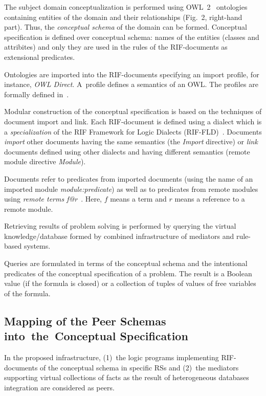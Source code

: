\begin{multicols}{2}
  The subject domain conceptualization is performed using OWL~2~\cite{28-kal}
ontologies containing entities of the domain and their relationships (Fig.~2,
  right-hand part). Thus, the \textit{conceptual schema} of the domain can be formed.
Conceptual specification is defined over conceptual schema: names of the entities (classes and attribites)
and only they are used in the rules of the RIF-documents as extensional predicates. 
  
  Ontologies are imported into the RIF-documents specifying an
import profile, for instance, \textit{OWL Direct}. A~profile defines a semantics of an
OWL. The profiles are formally defined in~\cite{27-kal}.

  Modular construction of the conceptual specification is based on the techniques of
document import and link. Each RIF-document is defined using a dialect which is a
\textit{specialization} of the RIF Framework for Logic Dialects
  (RIF-FLD)~\cite{19-kal}. Documents \textit{import} other documents having the
same semantics (the \textit{Import} directive) or \textit{link} documents defined
using other dialects and having different semantics (remote module directive
\textit{Module}). 

Documents refer to predicates from imported documents (using the
name of an imported module \textit{module:predicate}) as well as to predicates from
remote modules using \textit{remote terms f@r}~\cite{19-kal}. Here, $f$ means a
term and $r$ means a reference to a remote module.

  Retrieving results of problem solving is performed by querying the virtual
knowledge/database formed by combined infrastructure of mediators and rule-based
systems. 

Queries are formulated in terms of the conceptual schema and the intentional
predicates of the conceptual specification of a problem. The result is a Boolean value
(if the formula is closed) or a collection of tuples of values of free variables of the
formula.



\subsection{Mapping of the Peer Schemas into~the~Conceptual Specification}

  \noindent
  In the proposed infrastructure, (1)~the logic programs implementing
  RIF-documents of the conceptual schema in specific RSs and (2)~the mediators
supporting virtual collections of facts as the result of heterogeneous databases
integration are considered as peers.


\end{multicols}
